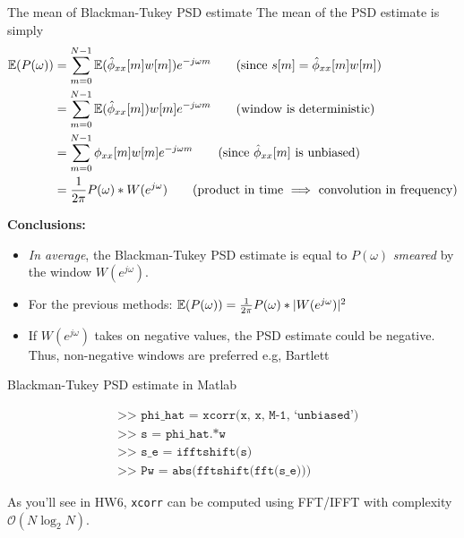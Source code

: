\documentclass[10pt]{beamer}
\begin{document}
%
\begin{frame}{The mean of Blackman-Tukey PSD estimate}
The mean of the PSD estimate is simply
\begin{align*}
	\E(P(\omega)) &= \sum_{m = 0}^{N-1}\E(\hat{\phi}_{xx}[m]w[m])e^{-j\omega m} \tag{since $s[m] = \hat{\phi}_{xx}[m]w[m]$} \\
	& = \sum_{m = 0}^{N-1}\E(\hat{\phi}_{xx}[m])w[m]e^{-j\omega m} \tag{window is deterministic}\\
	& = \sum_{m = 0}^{N-1}\phi_{xx}[m]w[m]e^{-j\omega m} \tag{since $\hat{\phi}_{xx}[m]$ is unbiased} \\
	&= \frac{1}{2\pi}P(\omega)\ast W(e^{j\omega}) \tag{product in time $\implies$ convolution in frequency}
\end{align*}

\textbf{Conclusions:} 
\begin{itemize} 
	\item\textit{In average}, the Blackman-Tukey PSD estimate is equal to $P(\omega)$ \textit{smeared} by the window $W(e^{j\omega})$.
	\item For the previous methods: $\operatorname{\mathbb{E}}(P(\omega)) = \frac{1}{2\pi}P(\omega)\ast |W(e^{j\omega})|^2$
	\item If $W(e^{j\omega})$ takes on negative values, the PSD estimate could be negative. Thus, non-negative windows are preferred e.g, Bartlett
\end{itemize} 
\end{frame}

%
\begin{frame}{Blackman-Tukey PSD estimate in Matlab}

\begin{align*}
& \texttt{>> phi\_hat = xcorr(x, x, M-1, `unbiased')} \tag{unbiased autocorrelation estimate}\\
& \texttt{>> s = phi\_hat.*w} \tag{windowing} \\
& \texttt{>> s\_e = ifftshift(s)} \tag{form DFT-even sequence} \\
& \texttt{>> Pw = abs(fftshift(fft(s\_e)))} \tag{two-sided PSD in interval $[-\pi, \pi)$}
\end{align*}

As you'll see in HW6, \texttt{xcorr} can be computed using FFT/IFFT with complexity $\mathcal{O}(N\log_2N)$.

\end{frame}
\end{document}
